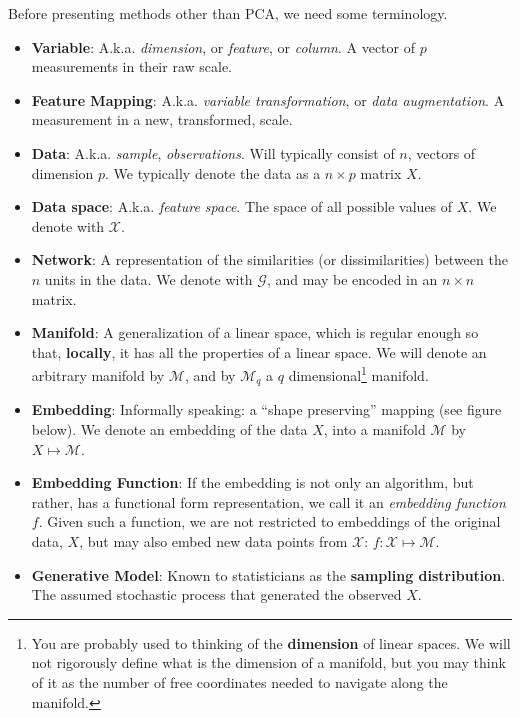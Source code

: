 \documentclass[]{book}
\theoremstyle{definition}
\theoremstyle{definition}
\theoremstyle{definition}
\theoremstyle{remark}
\begin{document}
Before presenting methods other than PCA, we need some terminology.

\begin{itemize}
\item
  \textbf{Variable}:
  A.k.a. \emph{dimension}, or \emph{feature}, or \emph{column}. A vector of \(p\) measurements in their raw scale.
\item
  \textbf{Feature Mapping}:
  A.k.a. \emph{variable transformation}, or \emph{data augmentation}. A measurement in a new, transformed, scale.
\item
  \textbf{Data}:
  A.k.a. \emph{sample}, \emph{observations}.
  Will typically consist of \(n\), vectors of dimension \(p\).
  We typically denote the data as a \(n\times p\) matrix \(X\).
\item
  \textbf{Data space}:
  A.k.a. \emph{feature space}. The space of all possible values of \(X\). We denote with \(\mathcal{X}\).
\item
  \textbf{Network}:
  A representation of the similarities (or dissimilarities) between the \(n\) units in the data. We denote with \(\mathcal{G}\), and may be encoded in an \(n \times n\) matrix.
\item
  \textbf{Manifold}:
  A generalization of a linear space, which is regular enough so that, \textbf{locally}, it has all the properties of a linear space.
  We will denote an arbitrary manifold by \(\mathcal{M}\), and by \(\mathcal{M}_q\) a \(q\) dimensional\footnote{You are probably used to thinking of the \textbf{dimension} of linear spaces. We will not rigorously define what is the dimension of a manifold, but you may think of it as the number of free coordinates needed to navigate along the manifold.} manifold.
\item
  \textbf{Embedding}:
  Informally speaking: a ``shape preserving'' mapping (see figure below). We denote an embedding of the data \(X\), into a manifold \(\mathcal{M}\) by \(X\mapsto \mathcal{M}\).
\item
  \textbf{Embedding Function}:
  If the embedding is not only an algorithm, but rather, has a functional form representation, we call it an \emph{embedding function} \(f\). Given such a function, we are not restricted to embeddings of the original data, \(X\), but may also embed new data points from \(\mathcal{X}\): \(f:\mathcal{X}\mapsto\mathcal{M}\).
\item
  \textbf{Generative Model}:
  Known to statisticians as the \textbf{sampling distribution}.
  The assumed stochastic process that generated the observed \(X\).
\end{itemize}
\end{document}
